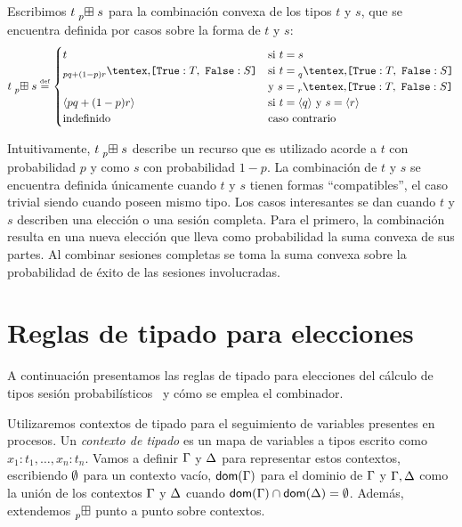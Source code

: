 \begin{definition}
  \label{def:ccomb}
  Escribimos $t \mathrel{\prescript{}{p}{\boxplus}} s$ para la combinación convexa de los tipos $t$ y $s$,
	que se encuentra definida por casos sobre la forma de $t$ y $s$:
  \[
    \csum{t}{s}
    \eqdef
    \begin{cases}
      t & \text{si $t = s$}
      \\
      \BinaryPChoice[pq+(1-p)r]{\SessionTypeT}{\SessionTypeS} & \text{si $t = \BinaryPChoice[q]{\SessionTypeT}{\SessionTypeS}$} \\ & \text{y $s = \BinaryPChoice[r]{\SessionTypeT}{\SessionTypeS}$}
      \\
      \ClosedSessionType[pq+(1-p)r] & \text{si $t = \ClosedSessionType[q]$ y $s = \ClosedSessionType[r]$}
      \\
      \text{indefinido} & \text{caso contrario}
    \end{cases}
  \]
\end{definition}

Intuitivamente, $t \mathrel{\prescript{}{p}{\boxplus}} s$ describe un recurso que es utilizado acorde a $t$
con probabilidad $p$ y como $s$ con probabilidad $1 - p$. La combinación de $t$
y $s$ se encuentra definida únicamente cuando $t$ y $s$ tienen formas
``compatibles'', el caso trivial siendo cuando poseen mismo tipo. Los casos
interesantes se dan cuando $t$ y $s$ describen una elección o una sesión
completa. Para el primero, la combinación resulta en una nueva elección que
lleva como probabilidad la suma convexa de sus partes. Al combinar sesiones
completas se toma la suma convexa sobre la probabilidad de éxito de las
sesiones involucradas.

\section{Reglas de tipado para elecciones}

A continuación presentamos las reglas de tipado para elecciones del cálculo de
tipos sesión probabilísticos~\cite{DBLP:conf/concur/InversoMPTT20} y cómo se emplea el
combinador.

Utilizaremos contextos de tipado para el seguimiento de variables presentes en
procesos. Un \emph{contexto de tipado} es un mapa de variables a tipos escrito
como $x_1 : t_1, \dots, x_n : t_n$. Vamos a definir $\Gamma$ y $\Delta$ para
representar estos contextos, escribiendo $\emptyset$ para un contexto vacío,
$\mathsf{dom}(\Gamma)$ para el dominio de $\Gamma$ y $\Gamma, \Delta$ como la unión de
los contextos $\Gamma$ y $\Delta$ cuando $\mathsf{dom}(\Gamma) \cap \mathsf{dom}(\Delta) =
\emptyset$. Además, extendemos $\mathrel{\prescript{}{p}{\boxplus}}$ punto a punto sobre contextos.

